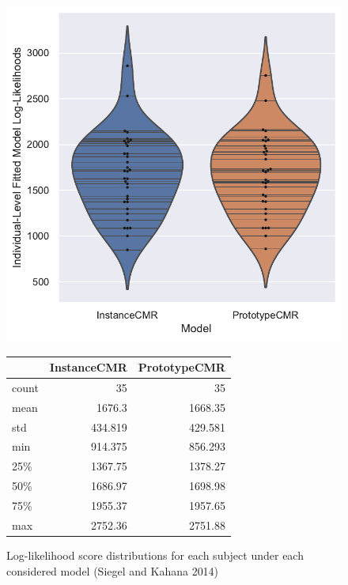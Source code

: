 \documentclass[
  letterpaper,
  DIV=11]{article}
\begin{document}
\begin{figure}

\begin{minipage}[c]{0.50\linewidth}

{\centering 

\includegraphics{./individual_lohnas2014.pdf}

}

\end{minipage}%
%
\begin{minipage}[c]{0.50\linewidth}

{\centering 

\begin{longtable}[]{@{}lrr@{}}
\toprule
& InstanceCMR & PrototypeCMR \\
\midrule
\endhead
count & 35 & 35 \\
mean & 1676.3 & 1668.35 \\
std & 434.819 & 429.581 \\
min & 914.375 & 856.293 \\
25\% & 1367.75 & 1378.27 \\
50\% & 1686.97 & 1698.98 \\
75\% & 1955.37 & 1957.65 \\
max & 2752.36 & 2751.88 \\
\bottomrule
\end{longtable}

}

\end{minipage}%

\caption{\label{fig-lohnasfits}Log-likelihood score distributions for
each subject under each considered model (Siegel and Kahana 2014)}

\end{figure}
\end{document}
